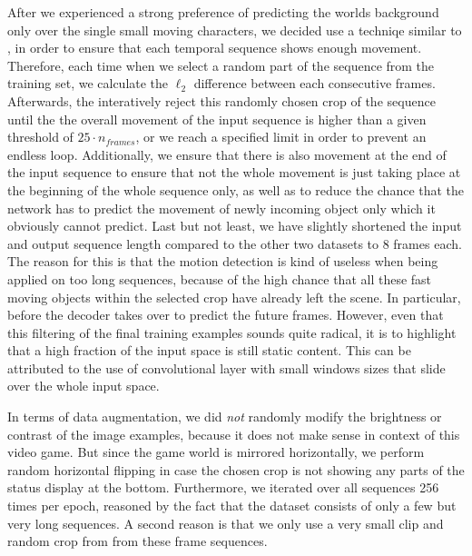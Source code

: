 After we experienced a strong preference of predicting the worlds background only over the single small moving characters, we decided use a techniqe similar to \parencite{deep_multiscale_video_pred}, in order to ensure that each temporal sequence shows enough movement. Therefore, each time when we select a random part of the sequence from the training set, we calculate the $\ell_2$ difference between each consecutive frames. Afterwards, the interatively reject this randomly chosen crop of the sequence until the the overall movement of the input sequence is higher than a given threshold of $25 \cdot n_{frames}$, or we reach a specified limit in order to prevent an endless loop. Additionally, we ensure that there is also movement at the end of the input sequence to ensure that not the whole movement is just taking place at the beginning of the whole sequence only, as well as to reduce the chance that the network has to predict the movement of newly incoming object only which it obviously cannot predict. Last but not least, we have slightly shortened the input and output sequence length compared to the other two datasets to \num{8} frames each. The reason for this is that the motion detection is kind of useless when being applied on too long sequences, because of the high chance that all these fast moving objects within the selected crop have already left the scene. In particular, before the decoder takes over to predict the future frames. However, even that this filtering of the final training examples sounds quite radical, it is to highlight that a high fraction of the input space is still static content. This can be attributed to the use of convolutional layer with small windows sizes that slide over the whole input space.

In terms of data augmentation, we did \textit{not} randomly modify the brightness or contrast of the image examples, because it does not make sense in context of this video game. But since the game world is mirrored horizontally, we perform random horizontal flipping in case the chosen crop is not showing any parts of the status display at the bottom. Furthermore, we iterated over all sequences \num{256} times per epoch, reasoned by the fact that the dataset consists of only a few but very long sequences. A second reason is that we only use a very small clip and random crop from from these frame sequences. 

